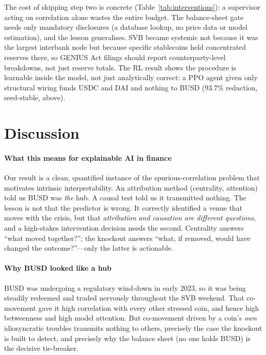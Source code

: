 \documentclass[sigconf,anonymous]{acmart}
\begin{document}
The cost of skipping step two is concrete (Table~\ref{tab:interventions}): a supervisor acting on
correlation alone wastes the entire budget. The balance-sheet gate needs only mandatory
disclosures (a database lookup, no price data or model estimation), and the lesson generalises. SVB
became systemic not because it was the largest interbank node but because specific stablecoins held
concentrated reserves there, so GENIUS Act filings should report counterparty-level breakdowns, not
just reserve totals. The RL result shows the procedure is learnable inside the model, not just analytically correct:
a PPO agent given only structural wiring funds USDC and DAI and
nothing to BUSD ($93.7\%$ reduction, seed-stable, above).

\section{Discussion}
\paragraph{What this means for explainable AI in finance} Our result is a clean, quantified instance
of the spurious-correlation problem that motivates intrinsic interpretability. An attribution method
(centrality, attention) told us BUSD was \emph{the} hub. A causal test told us it transmitted nothing.
The lesson is not that the predictor is wrong. It correctly identified a venue that moves with the
crisis, but that \emph{attribution and causation are different questions}, and a high-stakes
intervention decision needs the second. Centrality answers ``what moved together?''; the knockout
answers ``what, if removed, would have changed the outcome?''---only the latter is actionable.

\paragraph{Why BUSD looked like a hub} BUSD was undergoing a regulatory wind-down in early 2023, so
it was being steadily redeemed and traded nervously throughout the SVB weekend. That
co-movement gave it high correlation with every other stressed coin, and hence high betweenness and
high model attention. But co-movement driven by a coin's \emph{own} idiosyncratic troubles transmits
nothing to others, precisely the case the knockout is built to detect, and precisely why the balance
sheet (no one holds BUSD) is the decisive tie-breaker.
\end{document}
